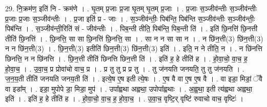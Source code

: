 \documentclass[17pt]{extarticle}
\begin{document}
29. नि॒क्रम॑ण॒ इति॑ नि - क्रम॑णे । . घृ॒तम् प्र॒जाः प्र॒जा घृ॒तम् घृ॒तम् प्र॒जाः । . प्र॒जाः स॒ञ्जीव॑न्तीः स॒ञ्जीव॑न्तीः प्र॒जाः प्र॒जाः स॒ञ्जीव॑न्तीः । . प्र॒जा इति॑ प्र - जाः । . स॒ञ्जीव॑न्तीः॒ पिब॑न्ति॒ पिब॑न्ति स॒ञ्जीव॑न्तीः स॒ञ्जीव॑न्तीः॒ पिब॑न्ति । . स॒ञ्जीव॑न्ती॒रिति॑ सं - जीव॑न्तीः । . पिब॒न्ती तीति॒ पिब॑न्ति॒ पिब॒न्ती ति॑ । . इति॑ छि॒नत्ति॑ छि॒नत्ती तीति॑ छि॒नत्ति॑ । . छि॒नत्ति॒ सा सा छि॒नत्ति॑ छि॒नत्ति॒ सा । . सा न न सा सा न । . न छि॑न॒त्ती(3) छि॑न॒त्ती(3) न न छि॑न॒त्ती(3) । . छि॒न॒त्ती(3) इतीति॑ छिन॒त्ती(3) छि॑न॒त्ती(3) इति॑ । . इति॒ न ने तीति॒ न । . न छि॑नत्ति छिनत्ति॒ न न छि॑नत्ति । . छि॒न॒त्ती तीति॑ छिनत्ति छिन॒त्ती ति॑ । . इति॑ ह॒ हे तीति॑ ह । . हो॒वा॒चो॒ वा॒च॒ ह॒ हो॒वा॒च॒ । . उ॒वा॒च॒ प्र प्रोवा॑चो वाच॒ प्र । . प्र तु तु प्र प्र तु । . तु ज॑नयति जनयति॒ तु तु ज॑नयति । . ज॒न॒य॒ती तीति॑ जनयति जनय॒ती ति॑ । . इत्ये॒ष ए॒ष इती त्ये॒षः । . ए॒ष वै वा ए॒ष ए॒ष वै । . वा इडा॒ मिडां॒ ॅवै वा इडा᳚म् । . इडा॒ मुपोपे डा॒ मिडा॒ मुप॑ । . उपा᳚ह्वथा अह्वथा॒ उपोपा᳚ह्वथाः । . अ॒ह्व॒था॒ इती त्य॑ह्वथा अह्वथा॒ इति॑ । . इति॑ ह॒ हे तीति॑ ह । . हो॒वा॒चो॒ वा॒च॒ ह॒ हो॒वा॒च॒ । . उ॒वा॒च॒ वृष्टि॒र् वृष्टि॑ रुवाचो वाच॒ वृष्टिः॑ । \newline
\end{document}
